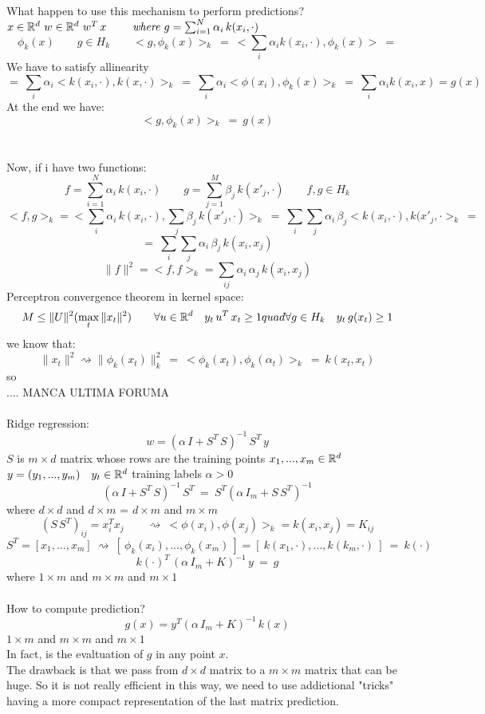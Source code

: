 \documentclass[../main.tex]{subfiles}
\begin{document}
\\\\
What happen to use this mechanism to perform predictions?
\\
$
x \in \mathbb{R}^d \ w \in \mathbb{R}^d \ w^T \, x \qquad \textit{\ where } g = \sum_{i=1}^N \alpha_i \, k (x_i, \cdot)
$
$$
\phi_k(x) \qquad g \in H_k \qquad <g, \phi_k(x)>_k \ = \ <\sum_i \alpha_i k(x_i, \cdot), \phi_k(x)> \  = $$
We have to satisfy allinearity
$$
= \ \sum_i \alpha_i <k(x_i, \cdot), k(x, \cdot) >_k \ = \ \sum_i \alpha_i <\phi(x_i), \phi_k(x)>_k \ = \ \sum_i \alpha_i k(x_i, x) = g(x)
$$
At the end we have:
$$
<g, \phi_k(x)>_k \ = \ g(x)
$$
\\\\
Now, if i have two functions:
$$
f = \sum_{i=1}^N \alpha_i \, k(x_i, \cdot) \qquad g = \sum_{j=1}^M \beta_j \, k (x'_j, \cdot) \qquad f,g \in H_k
$$
$$
<f,g>_k = <\sum_i \alpha_i \, k(x_i,\cdot) , \sum_j \beta_j \, k(x'_j, \cdot) >_k \ =
\ \sum_i \sum_j \alpha_i \, \beta_j <k(x_i, \cdot), k(x'_j, \cdot>_k \ =
$$
$$
= \ \sum_i \sum_j \alpha_i \, \beta_j \, k(x_i, x_j)
$$
$$
\|f\|^2 = <f,f>_k = \sum_{ij} \alpha_i \, \alpha_j \, k(x_i, x_j)
$$
Perceptron convergence theorem in kernel space:
$$
M \leq \|U\|^2 ( \max_t \|x_t\| ^2) \qquad \forall u \in \mathbb{R}^d \quad y_t \, u^T \, x_t \geq 1 quad \forall g \in H_k \quad y_t \, g(x_t) \geq 1
$$
we know that:
$$
\|x_t \|^2 \rightsquigarrow \| \phi_k(x_t)\|^2_k \ = \ <\phi_k(x_t), \phi_k(\alpha_t) >_k \  = \ k (x_t,x_t)
$$
so 
\\
.... MANCA ULTIMA FORUMA
\\\\
Ridge regression:
$$
w = \left( \alpha \, I + S^T \, S \right)^{-1} \, S^T \, y
$$
$S$ is $m \times d$ matrix whose rows are the training points $x_1,..., x_m \in \mathbb{R}^d$
\\
$y = (y_1,...,y_m) \quad y_t \in \mathbb{R}^d$ training labels $\alpha >0$
$$
\left( \alpha \, I + S^T \, S \right)^{-1} \, S^T \ = \ S^T \left( \alpha \, I_m + S\, S^T\right)^{-1}
$$
where $d \times d$ and $d \times m $ = $ d \times
m$ and $m \times m$
$$
\left( S \, S^T\right)_{ij} = x_i^T x_j \qquad \rightsquigarrow \ <\phi(x_i),\phi(x_j)>_k = k(x_i, x_j) = K_{ij}
$$ 
$$
S^T = \left[ x_1,...,x_m \right] \ \rightsquigarrow\ \left[  \ \phi_k(x_i),..., \phi_k(x_m) \ \right] = \left[ \ k(x_1, \cdot), ..., k(k_m, \cdot) \  \right] \ = \ k(\cdot)
$$ 
$$
k (\cdot)^T \, \left( \alpha \, I_m + K \right)^{-1} \, y \ = \ g
$$
where $1 \times
m$ and $m \times
m$ and $m \times
1$\\\\
How to compute prediction?
$$
g(x) = y^T \left( \alpha \, I_m + K \right)^{-1} \, k(x) 
$$
\qquad $1 \times m$ and $m \times m$ and $m \times 1$
\\
In fact, is the evaltuation of $g$ in any point $x$.
\\
The drawback is that we pass from $d \times d$ matrix to a $m \times m$ matrix that can be huge. So it is not really efficient in this way, we need to use addictional "tricks" having a more compact representation of the last matrix prediction. 
\newpage
\end{document}
